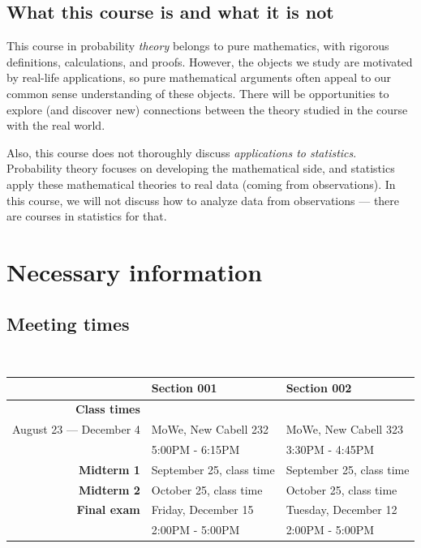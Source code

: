 \documentclass[oneside,11pt]{amsart}
\begin{document}
\subsection*{What this course is and what it is not}

This course in probability \emph{theory} belongs to pure mathematics, with rigorous definitions, calculations, and proofs. However, the objects we study are motivated by real-life applications, so pure mathematical arguments often appeal to our common sense understanding of these objects. There will be opportunities to explore (and discover new) connections between the theory studied in the course with the real world.

Also, this course does not thoroughly discuss \emph{applications to statistics}. Probability theory focuses on developing the mathematical side, and statistics apply these mathematical theories to real data (coming from observations). In this course, we will not discuss how to analyze data from observations --- there are courses in statistics for that.

\section{Necessary information}
\label{sec:necc}

\subsection{Meeting times}{\ }\\
\label{sub:meeting_times}


\begin{tabular}{|r|l|l|}
	\hline
	& Section 001 & Section 002 \\
	\hline
	\textbf{Class times} & & \\
	August 23 --- December 4 & MoWe, New Cabell 232 & MoWe, New Cabell 323 \\
	& 5:00PM - 6:15PM & 3:30PM - 4:45PM \\
	\hline
	\textbf{Midterm 1} & September 25, class time & September 25, class time \\
	\hline
	\textbf{Midterm 2} & October 25, class time & October 25, class time \\
	\hline
	\textbf{Final exam} & Friday, December 15  & Tuesday, December 12\\
	& 2:00PM - 5:00PM & 2:00PM - 5:00PM
	\\
	\hline
\end{tabular}
\end{document}
